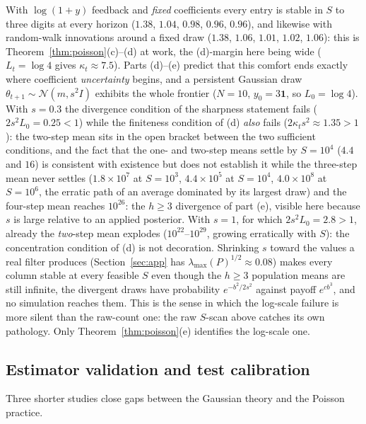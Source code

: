 \documentclass[12pt]{article}
\theoremstyle{plain}
\theoremstyle{definition}
\theoremstyle{remark}
\newcommand{\one}{\mathbf{1}}
\newcommand{\calN}{\mathcal{N}}
\begin{document}
With $\log(1+y)$ feedback and \emph{fixed} coefficients every entry is stable in $S$ to three digits at every horizon ($1.38$, $1.04$, $0.98$, $0.96$, $0.96$), and likewise with random-walk innovations around a fixed draw ($1.38$, $1.06$, $1.01$, $1.02$, $1.06$): this is Theorem~\ref{thm:poisson}(c)--(d) at work, the (d)-margin here being wide ($L_t=\log4$ gives $\kappa_t\approx7.5$). Parts (d)--(e) predict that this comfort ends exactly where coefficient \emph{uncertainty} begins, and a persistent Gaussian draw $\theta_{t+1}\sim\calN(m,s^2I)$ exhibits the whole frontier ($N=10$, $y_0=3\one$, so $L_0=\log4$). With $s=0.3$ the divergence condition of the sharpness statement fails ($2s^2L_0=0.25<1$) while the finiteness condition of (d) \emph{also} fails ($2\kappa_ts^2\approx1.35>1$): the two-step mean sits in the open bracket between the two sufficient conditions, and the fact that the one- and two-step means settle by $S=10^4$ ($4.4$ and $16$) is consistent with existence but does not establish it while the three-step mean never settles ($1.8\times10^{7}$ at $S=10^3$, $4.4\times10^{5}$ at $S=10^4$, $4.0\times10^{8}$ at $S=10^6$, the erratic path of an average dominated by its largest draw) and the four-step mean reaches $10^{26}$: the $h\ge3$ divergence of part (e), visible here because $s$ is large relative to an applied posterior. With $s=1$, for which $2s^2L_0=2.8>1$, already the \emph{two}-step mean explodes ($10^{22}$--$10^{29}$, growing erratically with $S$): the concentration condition of (d) is not decoration. Shrinking $s$ toward the values a real filter produces (Section~\ref{sec:app} has $\lambda_{\max}(P)^{1/2}\approx0.08$) makes every column stable at every feasible $S$ even though the $h\ge3$ population means are still infinite, the divergent draws have probability $e^{-b^2/2s^2}$ against payoff $e^{cb^3}$, and no simulation reaches them. This is the sense in which the log-scale failure is more silent than the raw-count one: the raw $S$-scan above catches its own pathology. Only Theorem~\ref{thm:poisson}(e) identifies the log-scale one.


\subsection{Estimator validation and test calibration}\label{sec:s4}

Three shorter studies close gaps between the Gaussian theory and the Poisson practice.
\end{document}
